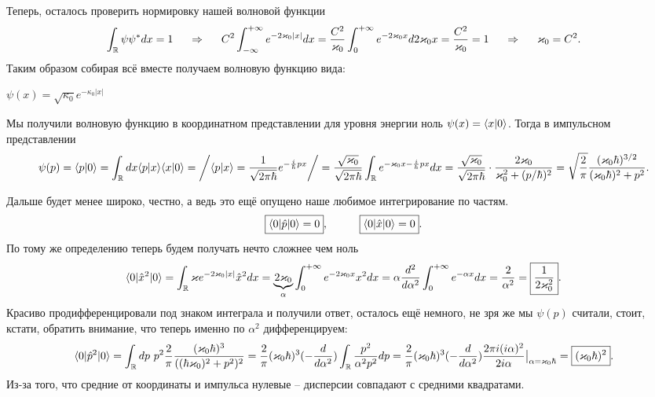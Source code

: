 Теперь, осталось проверить нормировку нашей волновой функции
\begin{equation*}
	\int_{\mathbb{R}} \psi \psi^* d x = 1
	\hspace{0.5 cm}
	\Rightarrow
	\hspace{0.5 cm}
	C^2 \int_{-\infty}^{+\infty} e^{- 2 \kappa_0 |x|} d x = \frac{C^2}{\kappa_0} \int_{0}^{+\infty} e^{- 2 \kappa_0 x} d 2 \kappa_0 x
	= 
	\frac{C^2}{\kappa_0} = 1
	\hspace{0.5 cm}
	\Rightarrow
	\hspace{0.5 cm}
	\kappa_0 = C^2.
\end{equation*}
Таким образом собирая всё вместе получаем волновую функцию вида:
\begin{flushright}
	$\boxed{\psi(x) =  \sqrt{\kappa_0} e^{- \kappa_0|x|}}$
\end{flushright}

Мы получили волновую функцию в координатном представлении для уровня энергии ноль $\psi(x) = \bk{x}{0}$.
Тогда в импульсном представлении
\begin{equation*}
	\psi(p) = \bk{p}{0} = \int_\mathbb{R} d x \bk{p}{x} \bk{x}{0}
	=
	\bigg/
	\bk{p}{x} = \frac{1}{\sqrt{2 \pi \hbar}} e^{- \frac{i}{\hbar} p x
	}
	\bigg/	
	=
	\frac{\sqrt{\kappa_0}}{\sqrt{2 \pi \hbar}} \int_\mathbb{R} e^{- \kappa_0 x - \frac{i}{h}p x} d x
	=
	\frac{\sqrt{\kappa_0}}{\sqrt{2 \pi \hbar}} \cdot \frac{2 \kappa_0}{\kappa_0^2 + (p/\hbar)^2}
	= \sqrt{\frac{2}{\pi}} \frac{(\kappa_0 \hbar)^{3/2}}{(\kappa_0 \hbar)^2 + p^2}.
\end{equation*}

Дальше будет менее широко, честно, а ведь это ещё опущено наше любимое интегрирование по частям.
\begin{equation*}
	\boxed{\bk{0}[\hat{p}]{0} = 0},
	\hspace{1 cm}
	\boxed{\bk{0}[\hat{x}]{0} = 0}.
\end{equation*}
По тому же определению теперь будем получать нечто сложнее чем ноль
\begin{equation*}
	\bk{0}[\hat{x}^2]{0} = \int_{\mathbb{R}} \kappa e^{- 2 \kappa_0 |x|} \hat{x}^2 d x = \underbrace{2 \kappa_0}_{\alpha} \int_{0}^{+\infty} e^{- 2 \kappa_0 x} x^2 d x = \alpha \frac{d^2}{d \alpha^2} \int_{0}^{+\infty} e^{- \alpha x}d x = \frac{2}{\alpha^2} = \boxed{\frac{1}{2\kappa_0^2}}.
\end{equation*}
Красиво продифференцировали под знаком интеграла и получили ответ, осталось ещё немного, не зря же мы $\psi(p)$ считали, стоит, кстати, обратить внимание, что теперь именно по $\alpha^2$ дифференцируем:
\begin{equation*}
	\bk{0}[\hat{p}^2]{0} = \int_{\mathbb{R}} d p \ p^2 \frac{2}{\pi} \frac{(\kappa_0 \hbar)^3}{((\hbar \kappa_0)^2 + p^2)^2} 
	=
	\frac{2}{\pi} (\kappa_0 \hbar)^3 (- \frac{d}{d \alpha^2}) \int_{\mathbb{R}} \frac{p^2}{\alpha^2 p^2} d p
	=
	\frac{2}{\pi} (\kappa_0 \hbar)^3 (- \frac{d}{d \alpha^2}) \frac{2 \pi i (i \alpha)^2}{2 i \alpha} \big|_{\alpha = \kappa_0 \hbar} = \boxed{(\kappa_0 \hbar)^2}.
\end{equation*}
Из-за того, что средние от координаты и импульса нулевые -- дисперсии совпадают с средними квадратами.

